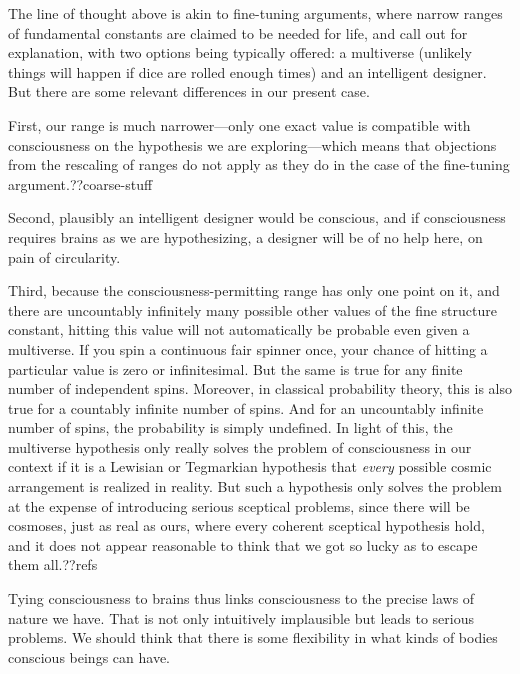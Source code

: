 The line of thought above is akin to fine-tuning arguments, where narrow ranges of fundamental constants
are claimed to be needed for life, and call out for explanation, with two options being typically offered:
a multiverse (unlikely things will happen if dice are rolled enough times) and an intelligent designer. But there are
some relevant differences in our present case. 

First, our range is much narrower---only one exact
value is compatible with consciousness on the hypothesis we are exploring---which means that objections from
the rescaling of ranges do not apply as they do in the case of the fine-tuning argument.??coarse-stuff 

Second, plausibly an intelligent designer
would be conscious, and if consciousness requires brains as we are hypothesizing, a designer will be of no help
here, on pain of circularity. 

Third, because the consciousness-permitting range has only one point on it, 
and there are uncountably infinitely many possible other values of the fine structure constant, hitting this value
will not automatically be probable even given a multiverse. If you spin a continuous fair spinner once, 
your chance of hitting a particular value is zero or infinitesimal. But the same is true for any finite number of independent spins.
Moreover, in classical probability theory, this is also true for a countably infinite number of spins. And for an
uncountably infinite number of spins, the probability is simply undefined. In light of this, the multiverse hypothesis only
really solves the problem of consciousness in our context if it is a Lewisian or Tegmarkian hypothesis that \textit{every} 
possible cosmic arrangement is realized in reality. But such a hypothesis only solves the problem at the expense of introducing serious
sceptical problems, since there will be cosmoses, just as real as ours, where every coherent sceptical hypothesis hold, and it does
not appear reasonable to think that we got so lucky as to escape them all.??refs

Tying consciousness to brains thus links consciousness to the precise laws of nature we have. That is not only intuitively implausible
but leads to serious problems. We should think that there is some flexibility in what kinds of bodies conscious beings can have.

